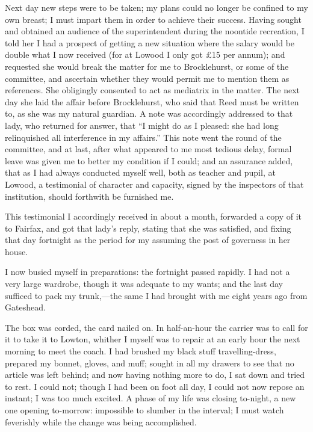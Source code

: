 Next day new steps were to be taken; my plans could no longer be
confined to my own breast; I must impart them in order to achieve their
success. Having sought and obtained an audience of the superintendent
during the noontide recreation, I told her I had a prospect of getting a
new situation where the salary would be double what I now received (for
at Lowood I only got £15 per annum); and requested she would break the
matter for me to \Mr{} Brocklehurst, or some of the committee, and
ascertain whether they would permit me to mention them as references. 
She obligingly consented to act as mediatrix in the matter. The next
day she laid the affair before \Mr{} Brocklehurst, who said that \Mrs{} Reed
must be written to, as she was my natural guardian. A note was
accordingly addressed to that lady, who returned for answer, that
\enquote{I might do as I pleased: she had long relinquished all
interference in my affairs.} This note went the round of the committee,
and at last, after what appeared to me most tedious delay, formal leave
was given me to better my condition if I could; and an assurance added,
that as I had always conducted myself well, both as teacher and pupil,
at Lowood, a testimonial of character and capacity, signed by the
inspectors of that institution, should forthwith be furnished me.

This testimonial I accordingly received in about a month, forwarded a
copy of it to \Mrs{} Fairfax, and got that lady's reply, stating that she
was satisfied, and fixing that day fortnight as the period for my
assuming the post of governess in her house.

I now busied myself in preparations: the fortnight passed rapidly. I
had not a very large wardrobe, though it was adequate to my wants; and
the last day sufficed to pack my trunk,---the same I had brought with me
eight years ago from Gateshead.

The box was corded, the card nailed on. In half-an-hour the carrier was
to call for it to take it to Lowton, whither I myself was to repair at
an early hour the next morning to meet the coach. I had brushed my
black stuff travelling-dress, prepared my bonnet, gloves, and muff;
sought in all my drawers to see that no article was left behind; and now
having nothing more to do, I sat down and tried to rest. I could not;
though I had been on foot all day, I could not now repose an instant; I
was too much excited. A phase of my life was closing to-night, a new
one opening to-morrow: impossible to slumber in the interval; I must
watch feverishly while the change was being accomplished.

